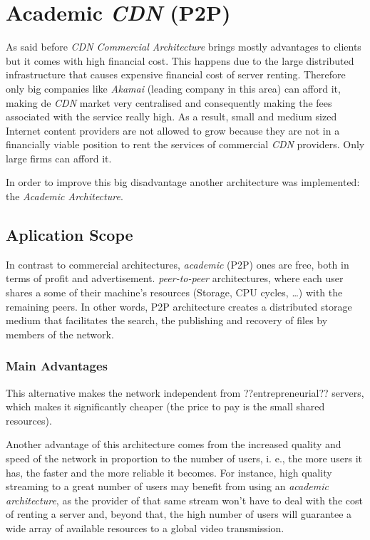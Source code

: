 \documentclass{llncs}
\begin{document}
\section{Academic \textit{CDN} (P2P)}						%

As said before \emph{CDN Commercial Architecture} brings mostly advantages to clients but it comes with high financial cost. This
happens due to the large distributed infrastructure that causes expensive
financial cost of server renting. Therefore only big companies like \emph{Akamai}
(leading company in this area) can afford it, making de \textit{CDN} market very
centralised and consequently making the fees associated with the service
really high. As a result, small and medium sized Internet content providers
are not allowed to grow because they are not in a financially viable position
to rent the services of commercial \textit{CDN} providers. Only large firms can
afford it.


In order to improve this big disadvantage another architecture was implemented:
the \emph{Academic Architecture}.

\subsection{Aplication Scope}

In contrast to commercial architectures, \emph{academic} (P2P) ones are free, both in terms of profit and advertisement. \emph{peer-to-peer} architectures, where each user shares a some of their machine's resources (Storage, CPU cycles, \dots) with the remaining
peers. 
In other words, P2P architecture creates a distributed storage medium that facilitates the search, the publishing and recovery of files by members of the network.

\subsubsection{Main Advantages}

This alternative makes the network independent from ??entrepreneurial?? servers,
which makes it significantly cheaper (the price to pay is the small shared resources).

Another advantage of this architecture comes from the increased quality and speed
of the network in proportion to the number of users, i. e., the more users it has,
the faster and the more reliable it becomes. 
For instance, high quality streaming to a great number of users may benefit from
using an \emph{academic architecture}, as the provider of that same stream won't
have to deal with the cost of renting a server and, beyond that, the high number
of users will guarantee a wide array of available resources to a global video
transmission.
\end{document}
